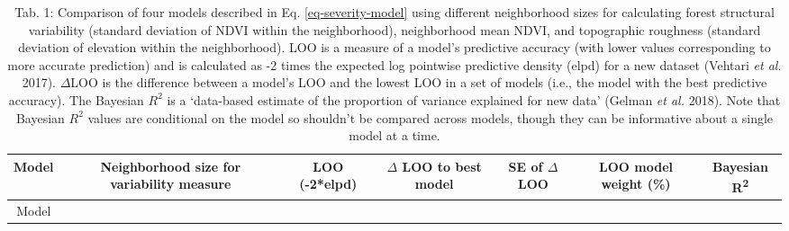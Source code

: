 \documentclass[]{article}
\begin{document}
\begin{longtable}[]{@{}ccccccc@{}}
\caption{Tab. 1: Comparison of four models described in Eq.
\ref{eq-severity-model} using different neighborhood sizes for
calculating forest structural variability (standard deviation of NDVI
within the neighborhood), neighborhood mean NDVI, and topographic
roughness (standard deviation of elevation within the neighborhood). LOO
is a measure of a model's predictive accuracy (with lower values
corresponding to more accurate prediction) and is calculated as -2 times
the expected log pointwise predictive density (elpd) for a new dataset
(Vehtari \emph{et al.} 2017). \(\Delta\)LOO is the difference between a
model's LOO and the lowest LOO in a set of models (i.e., the model with
the best predictive accuracy). The Bayesian \(R^2\) is a `data-based
estimate of the proportion of variance explained for new data' (Gelman
\emph{et al.} 2018). Note that Bayesian \(R^2\) values are conditional
on the model so shouldn't be compared across models, though they can be
informative about a single model at a time.}\tabularnewline
\toprule
\begin{minipage}[b]{0.06\columnwidth}\centering
Model\strut
\end{minipage} & \begin{minipage}[b]{0.17\columnwidth}\centering
Neighborhood size for variability measure\strut
\end{minipage} & \begin{minipage}[b]{0.09\columnwidth}\centering
LOO (-2*elpd)\strut
\end{minipage} & \begin{minipage}[b]{0.11\columnwidth}\centering
\(\Delta\) LOO to best model\strut
\end{minipage} & \begin{minipage}[b]{0.11\columnwidth}\centering
SE of \(\Delta\) LOO\strut
\end{minipage} & \begin{minipage}[b]{0.16\columnwidth}\centering
LOO model weight (\%)\strut
\end{minipage} & \begin{minipage}[b]{0.11\columnwidth}\centering
Bayesian R\textsuperscript{2}\strut
\end{minipage}\tabularnewline
\midrule
\endfirsthead
\toprule
\begin{minipage}[b]{0.06\columnwidth}\centering
Model\strut
\end{minipage} & \begin{minipage}[b]{0.17\columnwidth}\centering

\end{minipage}
\end{longtable}
\end{document}
